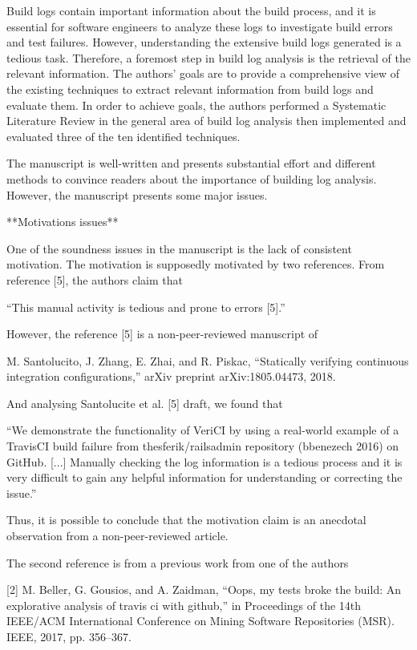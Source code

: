 \documentclass[10pt,a4wide]{article}
\renewenvironment{leftbar}{%
	\vspace{0.1cm}
	\def\FrameCommand{\vrule width 0.4pt \hspace{15pt}}%
	\MakeFramed {\advance\hsize-\width \FrameRestore}}%
{\endMakeFramed\vspace{0.1cm}}
\begin{document}
\begin{leftbar}
Build logs contain important information about the build process, and it is essential for software engineers to analyze these logs to investigate build errors and test failures. However, understanding the extensive build logs generated is a tedious task. Therefore, a foremost step in build log analysis is the retrieval of the relevant information.  The authors' goals are to provide a comprehensive view of the existing techniques to extract relevant information from build logs and evaluate them. In order to achieve goals, the authors performed a Systematic Literature Review in the general area of build log analysis then implemented and evaluated three of the ten identified techniques.


The manuscript is well-written and presents substantial effort and different methods to convince readers about the importance of building log analysis. However, the manuscript presents some major issues.


**Motivations issues**

One of the soundness issues in the manuscript is the lack of consistent motivation. The motivation is supposedly motivated by two references. From reference [5], the authors claim that

“This manual activity is tedious and prone to errors [5].”

However, the reference [5] is a non-peer-reviewed manuscript of

M. Santolucito, J. Zhang, E. Zhai, and R. Piskac, “Statically verifying continuous integration configurations,” arXiv preprint arXiv:1805.04473, 2018.

And analysing Santolucite et al. [5] draft, we found that

“We demonstrate the functionality of VeriCI by using a real-world example of a TravisCI build failure from thesferik/railsadmin repository (bbenezech 2016) on GitHub. [...]  Manually checking the log information is a tedious process and it is very difficult to gain any helpful information for understanding or correcting the issue.”

Thus,  it is possible to conclude that the motivation claim is an anecdotal observation from a non-peer-reviewed article.

The second reference is from a previous work from one of the authors

[2] M. Beller, G. Gousios, and A. Zaidman, “Oops, my tests broke
the build: An explorative analysis of travis ci with github,”
in Proceedings of the 14th IEEE/ACM International Conference on
Mining Software Repositories (MSR). IEEE, 2017, pp. 356–367.



\end{leftbar}
\end{document}
